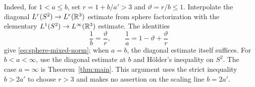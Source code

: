 Indeed, for $1<a\le b$, set $r=1+b/a'>3$ and $\vartheta=r/b\le1$.
Interpolate the diagonal $L^r(S^2)\to L^r(\mathbb R^3)$ estimate from
sphere factorization with the elementary $L^1(S^2)\to L^\infty(\mathbb R^3)$
estimate. The identities
\[
 \frac1b=\frac{\vartheta}{r},\qquad
 \frac1a=1-\vartheta+\frac{\vartheta}{r}
\]
give \eqref{eq:sphere-mixed-norm}; when $a=b$, the diagonal estimate
itself suffices. For $b<a<\infty$, use the diagonal estimate at $b$
and H\"older's inequality on $S^2$. The case $a=\infty$ is
Theorem~\ref{thm:main}. This argument uses the strict inequality
$b>2a'$ to choose $r>3$ and makes no assertion on the scaling line
$b=2a'$.
